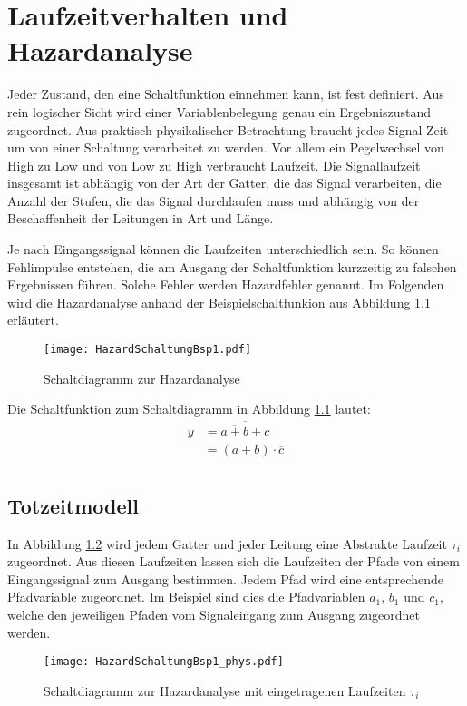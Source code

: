 \chapter{Laufzeitverhalten und Hazardanalyse}
Jeder Zustand, den eine Schaltfunktion einnehmen kann, ist fest definiert. Aus rein logischer Sicht wird einer Variablenbelegung genau ein Ergebniszustand zugeordnet. Aus praktisch physikalischer Betrachtung braucht jedes Signal Zeit um von einer Schaltung verarbeitet zu werden. Vor allem ein Pegelwechsel von High zu Low und von Low zu High verbraucht Laufzeit. Die Signallaufzeit insgesamt ist abhängig von der Art der Gatter, die das Signal verarbeiten, die Anzahl der Stufen, die das Signal durchlaufen muss und abhängig von der Beschaffenheit der Leitungen in Art und Länge. 

Je nach Eingangssignal können die Laufzeiten unterschiedlich sein. So können Fehlimpulse entstehen, die am Ausgang der Schaltfunktion kurzzeitig zu falschen Ergebnissen führen. Solche Fehler werden Hazardfehler genannt. Im Folgenden wird die Hazardanalyse anhand der Beispielschaltfunkion aus Abbildung \ref{SchaltHazBsp1} erläutert.

\begin{figure}[htp]
	\centering
	\texttt{[image: HazardSchaltungBsp1.pdf]}
	\caption{Schaltdiagramm zur Hazardanalyse}
	\label{SchaltHazBsp1}
\end{figure}

Die Schaltfunktion zum Schaltdiagramm in Abbildung \ref{SchaltHazBsp1} lautet:
\begin{align*}
	y &= \overline{\overline{a+b} + c} \\
	  &= (a+b) \cdot \overline{c} \\	
\end{align*}

\section{Totzeitmodell}
In Abbildung \ref{SchaltHazBsp1_phys} wird jedem Gatter und jeder Leitung eine Abstrakte Laufzeit $\tau_i$ zugeordnet. Aus diesen Laufzeiten lassen sich die Laufzeiten der Pfade von einem Eingangssignal zum Ausgang bestimmen. Jedem Pfad wird eine entsprechende Pfadvariable zugeordnet. Im Beispiel sind dies die Pfadvariablen $a_1$, $b_1$ und $c_1$, welche den jeweiligen Pfaden vom Signaleingang zum Ausgang zugeordnet werden.
\begin{figure}[htp]
	\centering
	\texttt{[image: HazardSchaltungBsp1\_phys.pdf]}
	\caption{Schaltdiagramm zur Hazardanalyse mit eingetragenen Laufzeiten $\tau_i$}
	\label{SchaltHazBsp1_phys}
\end{figure}

